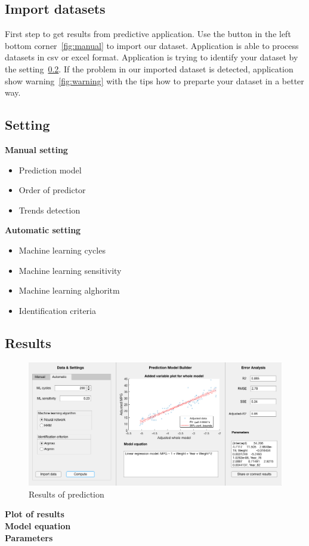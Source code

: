         \subsection{Import datasets}
        First step to get results from predictive application. Use the button in the left bottom corner~\ref{fig:manual} to import our dataset. Application is able to process datasets in csv or excel format. Application is trying to identify your dataset by the setting~\ref{subsec:setting}. If the problem in our imported dataset is detected, application show warning~\ref{fig:warning} with the tips how to preparte your dataset in a better way.
        \subsection{Setting}\label{subsec:setting}
        \textbf{Manual setting}\\
        \begin{itemize}
            \item Prediction model
            \item Order of predictor
            \item Trends detection
        \end{itemize}

        \textbf{Automatic setting}\\
        \begin{itemize}
            \item Machine learning cycles
            \item Machine learning sensitivity
            \item Machine learning alghoritm
            \item Identification criteria
        \end{itemize}
        \subsection{Results}\label{subsec:result}
        \begin{center}
            \begin{figure}[!ht]
                \centering
                \includegraphics[width=\textwidth]{figures/result.png}
                \caption{Results of prediction}
                \label{fig:results}
            \end{figure}
        \end{center}
        \textbf{Plot of results}\\
        \textbf{Model equation}\\
        \textbf{Parameters}\\